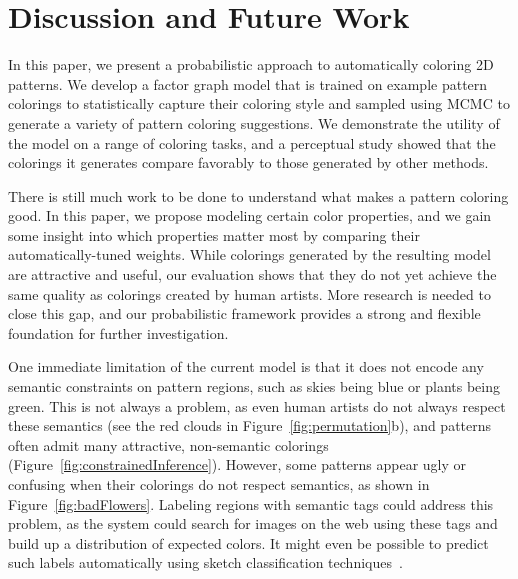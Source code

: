 \section{Discussion and Future Work}
\label{sec:discussion}

In this paper, we present a probabilistic approach to automatically coloring 2D patterns. We develop a factor graph model that is trained on example pattern colorings to statistically capture their coloring style and sampled using MCMC to generate a variety of pattern coloring suggestions. We demonstrate the utility of the model on a range of coloring tasks, and a perceptual study showed that the colorings it generates compare favorably to those generated by other methods.

There is still much work to be done to understand what makes a pattern coloring good. In this paper, we propose modeling certain color properties, and we gain some insight into which properties matter most by comparing their automatically-tuned weights. While colorings generated by the resulting model are attractive and useful, our evaluation shows that they do not yet achieve the same quality as colorings created by human artists. More research is needed to close this gap, and our probabilistic framework provides a strong and flexible foundation for further investigation.

One immediate limitation of the current model is that it does not encode any semantic constraints on pattern regions, such as skies being blue or plants being green. This is not always a problem, as even human artists do not always respect these semantics (see the red clouds in Figure~\ref{fig:permutation}b), and patterns often admit many attractive, non-semantic colorings (Figure~\ref{fig:constrainedInference}). However, some patterns appear ugly or confusing when their colorings do not respect semantics, as shown in Figure~\ref{fig:badFlowers}. Labeling regions with semantic tags could address this problem, as the system could search for images on the web using these tags and build up a distribution of expected colors. It might even be possible to predict such labels automatically using sketch classification techniques~\cite{SketchClassification}.

~

